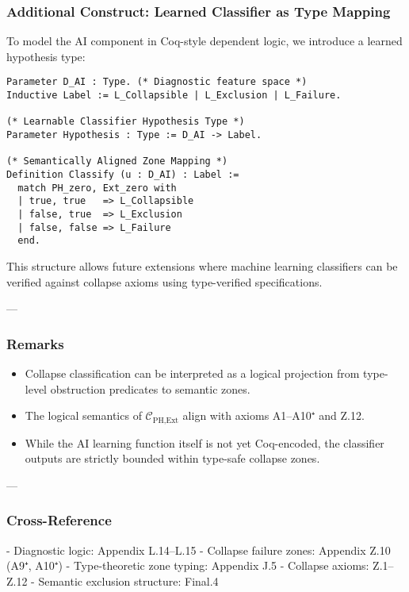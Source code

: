 \documentclass[11pt]{article}
\begin{document}
\begin{axiom}
\begin{axiom}
{{\subsubsection*{Additional Construct: Learned Classifier as Type Mapping}

To model the AI component in Coq-style dependent logic, we introduce a learned hypothesis type:

\begin{lstlisting}[language=Coq, caption=Classifier Hypothesis Type and Mapping]
Parameter D_AI : Type. (* Diagnostic feature space *)
Inductive Label := L_Collapsible | L_Exclusion | L_Failure.

(* Learnable Classifier Hypothesis Type *)
Parameter Hypothesis : Type := D_AI -> Label.

(* Semantically Aligned Zone Mapping *)
Definition Classify (u : D_AI) : Label :=
  match PH_zero, Ext_zero with
  | true, true   => L_Collapsible
  | false, true  => L_Exclusion
  | false, false => L_Failure
  end.
\end{lstlisting}

This structure allows future extensions where machine learning classifiers can be verified  
against collapse axioms using type-verified specifications.

---

\subsubsection*{Remarks}

\begin{itemize}
  \item Collapse classification can be interpreted as a logical projection from  
        type-level obstruction predicates to semantic zones.
  \item The logical semantics of \( \mathcal{C}_{\text{PH,Ext}} \) align with axioms A1–A10⁺ and Z.12.
  \item While the AI learning function itself is not yet Coq-encoded,  
        the classifier outputs are strictly bounded within type-safe collapse zones.
\end{itemize}

---

\subsubsection*{Cross-Reference}

- Diagnostic logic: Appendix L.14–L.15  
- Collapse failure zones: Appendix Z.10 (A9⁺, A10⁺)  
- Type-theoretic zone typing: Appendix J.5  
- Collapse axioms: Z.1–Z.12  
- Semantic exclusion structure: Final.4

}}
\end{axiom}
\end{axiom}
\end{document}
